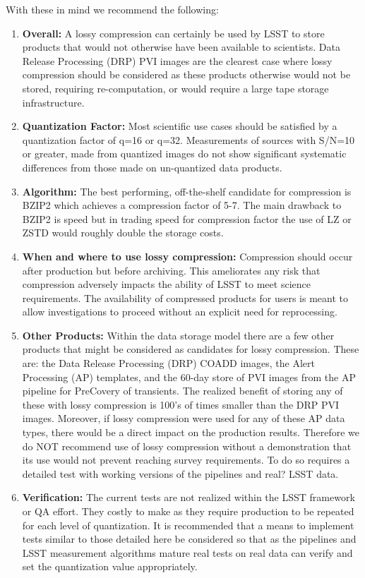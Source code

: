 With these in mind we recommend the following:
\begin{enumerate}
\item {\bf Overall:} A lossy compression can certainly be used by LSST to store products that would 
not otherwise have been available to scientists. Data Release Processing (DRP) PVI images are the 
clearest case where lossy compression should be considered as these products otherwise would not be stored, 
requiring re-computation, or would require a large tape storage infrastructure. 

\item {\bf Quantization Factor:} Most scientific use cases should be satisfied by a quantization 
factor of q=16 or q=32.  Measurements of sources with S/N=10 or greater, made from quantized images 
do not show significant systematic differences from those made on un-quantized data products.  

\item {\bf Algorithm:} The best performing, off-the-shelf candidate for compression is BZIP2 which 
achieves a compression factor of 5-7.  The main drawback to BZIP2 is speed but in trading speed for 
compression factor the use of LZ or ZSTD would roughly double the storage costs.  

\item {\bf When and where to use lossy compression:}  Compression should occur after production
but before archiving.  This ameliorates any risk that compression adversely impacts the ability 
of LSST to meet science requirements.  The availability of compressed products for
users is meant to allow investigations to proceed without an explicit need for reprocessing.  

\item {\bf Other Products:} Within the data storage model there are a few other products that 
might be considered as candidates for lossy compression.  These are: the Data Release Processing
(DRP) COADD images, the Alert Processing (AP) templates, and the 60-day store of PVI images from 
the AP pipeline for PreCovery of transients.  The realized benefit of storing any of these with 
lossy compression is 100's of times smaller than the DRP PVI images.  Moreover, if lossy compression 
were used for any of these AP data types, there would be a direct impact on the production results.  
Therefore we do NOT recommend use of lossy compression without a demonstration that its use would 
not prevent reaching survey requirements.  To do so requires a detailed test with working versions
of the pipelines and real? LSST data. 

\item {\bf Verification:} The current tests are not realized within the LSST framework or QA effort.
They costly to make as they require production to be repeated for each level of quantization.  
It is recommended that a means to implement tests similar to those detailed here be considered 
so that as the pipelines and LSST measurement algorithms mature real tests on real data can verify
and set the quantization value appropriately.

\end{enumerate}


